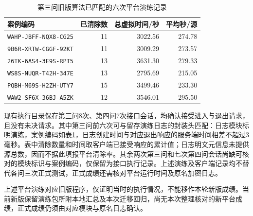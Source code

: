 \begin{table}[htbp]
\centering\small
\caption{第三问旧版算法已匹配的六次平台演练记录}
\label{tab:p3-practice}
\begin{tabular}{lrrr}
\toprule
案例编码 & 已清除数 & 总虚拟时间/秒 & 平均秒/源\\
\midrule
\texttt{WAHP-JBFF-NQX8-CG25}&11&3022.56&274.78\\
\texttt{9B6R-XRTW-CGGF-92KT}&11&3009.29&273.57\\
\texttt{26TK-6AS4-3E9S-RPT5}&13&3631.30&279.33\\
\texttt{WS8S-NUQR-T42H-347E}&13&2795.69&215.05\\
\texttt{PQBH-M69S-H2ZH-UTY7}&15&3499.46&233.30\\
\texttt{WAW2-SF6X-36BJ-A5ZK}&12&3546.01&295.50\\
\bottomrule
\end{tabular}
\end{table}

现有执行目录保存第三问8次、第四问7次接口会话，均确认接受进入与退出请求，且没有未决请求。其中第三问前六次可与留存演练日志的封装头匹配：日志模块标明演练，案例编码如表\ref{tab:p3-practice}，日志创建时间与对应退出响应的服务端时间相差不超过3毫秒。表中清除数量和时间取客户端已接受响应的累计值；日志明文元信息未提供源总数，因而不据此填报平台清除率。其余两次第三问和七次第四问会话尚缺可核对的模块标识与案例编码，仅保留为接口执行记录。上述演练及客户端记录均不替代各问三次正式测试，正式成绩还需核对平台运行时间及原名加密日志。

上述平台演练对应旧版程序，仅证明当时的执行情况，不能移作本轮新版成绩。当前新版保留演练包所附本地汇总及本次迁移回归，尚无本次整理核对的新平台成绩，正式成绩仍须由对应模块与原名日志确认。
